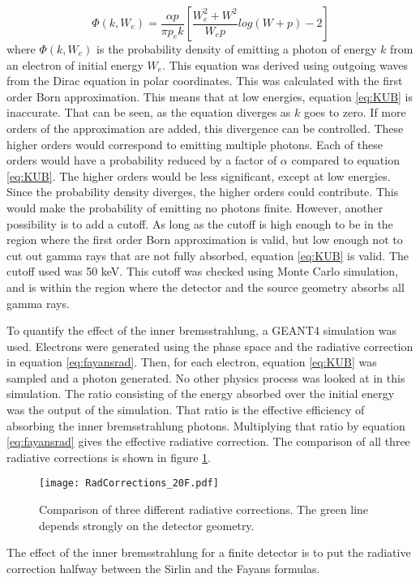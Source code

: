 \documentclass[../MaxHughesThesis.tex]{subfiles}
\begin{document}
\begin{equation}
	\Phi(k,W_{e}) = \frac{ \alpha p}{ \pi p_{e} k} [\frac{W_{e}^{2} + W^{2}}{W_{e}p}log(W + p) - 2]
	\label{eq:KUB}
\end{equation}
where $\Phi(k,W_{e})$ is the probability density of emitting a photon of energy $k$ from an electron of initial energy $W_{e}$.
This equation was derived using outgoing waves from the Dirac equation in polar coordinates.
This was calculated with the first order Born approximation.
This means that at low energies, equation \ref{eq:KUB} is inaccurate. 
That can be seen, as the equation diverges as $k$ goes to zero.
If more orders of the approximation are added, this divergence can be controlled.
These higher orders would correspond to emitting multiple photons.
Each of these orders would have a probability reduced by a factor of $\alpha$ compared to equation \ref{eq:KUB}.
The higher orders would be less significant, except at low energies. 
Since the probability density diverges, the higher orders could contribute.
This would make the probability of emitting no photons finite.	 		
However, another possibility is to add a cutoff. 
As long as the cutoff is high enough to be in the region where the first order Born approximation is valid, but low enough not to cut out gamma rays that are not fully absorbed, equation \ref{eq:KUB} is valid.
The cutoff used was 50 keV.
This cutoff was checked using Monte Carlo simulation, and is within the region where the detector and the source geometry absorbs all gamma rays.

To quantify the effect of the inner bremsstrahlung, a GEANT4 simulation was used.
Electrons were generated using the phase space and the radiative correction in equation \ref{eq:fayansrad}.
Then, for each electron, equation \ref{eq:KUB} was sampled and a photon generated.
No other physics process was looked at in this simulation.
The ratio consisting of the energy absorbed over the initial energy was the output of the simulation.
That ratio is the effective efficiency of absorbing the inner bremsstrahlung photons.
Multiplying that ratio by equation \ref{eq:fayansrad} gives the effective radiative correction.
The comparison of all three radiative corrections is shown in figure \ref{fig:rad}.

\begin{figure}[!htb]
	\centerline{\texttt{[image: RadCorrections\_20F.pdf]}}
	\caption{Comparison of three different radiative corrections.
		 The green line depends strongly on the detector geometry.
		 }
	\label{fig:rad}
\end{figure}
The effect of the inner bremsstrahlung for a finite detector is to put the radiative correction halfway between the Sirlin and the Fayans formulas.
\end{document}
